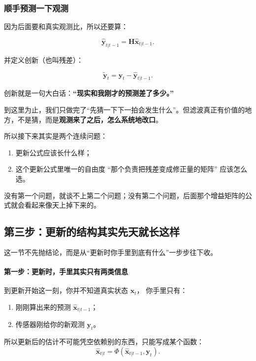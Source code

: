 \documentclass[12pt,a4paper]{ctexart}
\begin{document}
\begin{quote}
\end{quote}

\subsubsection{顺手预测一下观测}

因为后面要和真实观测比，所以还要算：

\[
\hat{\bm{y}}_{t|t-1} = \bm{H}\hat{\bm{x}}_{t|t-1}.
\]

并定义创新（也叫残差）：

\[
\tilde{\bm{y}}_t = \bm{y}_t - \hat{\bm{y}}_{t|t-1}.
\]

创新就是一句大白话：\textbf{“现实和我刚才的预测差了多少。”}

到这里为止，我们只做完了“先猜一下下一拍会发生什么”。但滤波真正有价值的地方，不是猜，而是\textbf{观测来了之后，怎么系统地改口}。

所以接下来其实是两个连续问题：
\begin{enumerate}
  \item 更新公式应该长什么样；
  \item 这个更新公式里唯一的自由度
  “那个负责把残差变成修正量的矩阵”
  应该怎么选。
\end{enumerate}

没有第一个问题，就谈不上第二个问题；没有第二个问题，后面那个增益矩阵的公式就会看起来像天上掉下来的。

\subsection{第三步：更新的结构其实先天就长这样}

这一节不先抛结论，而是从“更新时你手里到底有什么”一步步往下收。

\paragraph{第一步：更新时，手里其实只有两类信息}

到更新开始这一刻，你并不知道真实状态
\(\bm{x}_t\)，
你手里只有：
\begin{enumerate}
  \item 刚刚算出来的预测
  \(\hat{\bm{x}}_{t|t-1}\)；
  \item 传感器刚给你的新观测
  \(\bm{y}_t\)。
\end{enumerate}

所以更新后的估计不可能凭空依赖别的东西，只能写成某个函数：
\[
\hat{\bm{x}}_{t|t} = \Phi(\hat{\bm{x}}_{t|t-1}, \bm{y}_t).
\]
\end{document}
